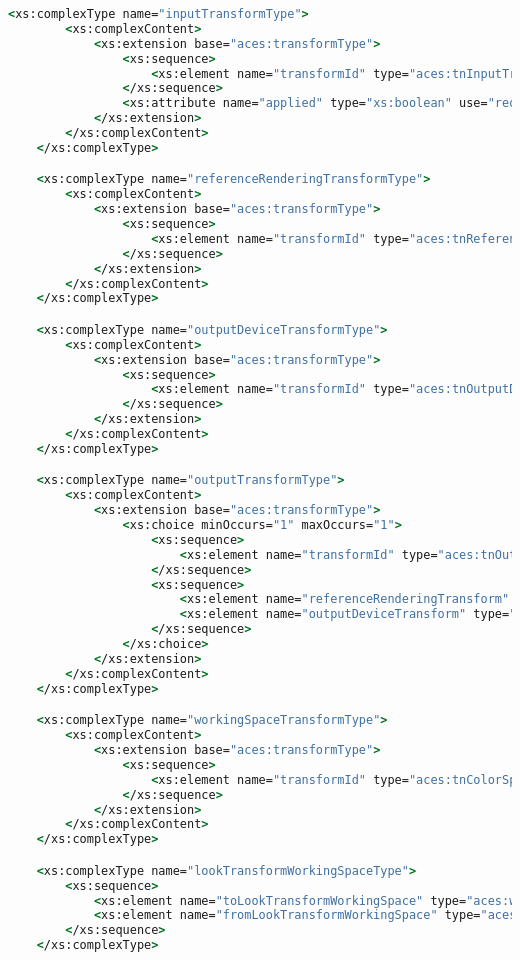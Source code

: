 \begin{lstlisting}[language=csh]
	<xs:complexType name="inputTransformType">
		<xs:complexContent>
			<xs:extension base="aces:transformType">
				<xs:sequence>
					<xs:element name="transformId" type="aces:tnInputTransform" minOccurs="1" maxOccurs="1"/>
				</xs:sequence>
				<xs:attribute name="applied" type="xs:boolean" use="required"/>
			</xs:extension>
		</xs:complexContent>
	</xs:complexType>

	<xs:complexType name="referenceRenderingTransformType">
		<xs:complexContent>
			<xs:extension base="aces:transformType">
				<xs:sequence>
					<xs:element name="transformId" type="aces:tnReferenceRenderingTransform" minOccurs="1" maxOccurs="1"/>
				</xs:sequence>
			</xs:extension>
		</xs:complexContent>
	</xs:complexType>

	<xs:complexType name="outputDeviceTransformType">
		<xs:complexContent>
			<xs:extension base="aces:transformType">
				<xs:sequence>
					<xs:element name="transformId" type="aces:tnOutputDeviceTransform" minOccurs="1" maxOccurs="1"/>
				</xs:sequence>
			</xs:extension>
		</xs:complexContent>
	</xs:complexType>

	<xs:complexType name="outputTransformType">
		<xs:complexContent>
			<xs:extension base="aces:transformType">
				<xs:choice minOccurs="1" maxOccurs="1">
					<xs:sequence>
						<xs:element name="transformId" type="aces:tnOutputTransform" minOccurs="1" maxOccurs="1"/>
					</xs:sequence>
					<xs:sequence>
						<xs:element name="referenceRenderingTransform" type="aces:referenceRenderingTransformType" minOccurs="1" maxOccurs="1"/>
						<xs:element name="outputDeviceTransform" type="aces:outputDeviceTransformType" minOccurs="1" maxOccurs="1"/>
					</xs:sequence>
				</xs:choice>
			</xs:extension>
		</xs:complexContent>
	</xs:complexType>

	<xs:complexType name="workingSpaceTransformType">
		<xs:complexContent>
			<xs:extension base="aces:transformType">
				<xs:sequence>
					<xs:element name="transformId" type="aces:tnColorSpaceConversionTransform" minOccurs="1" maxOccurs="1"/>
				</xs:sequence>
			</xs:extension>
		</xs:complexContent>
	</xs:complexType>

	<xs:complexType name="lookTransformWorkingSpaceType">
		<xs:sequence>
			<xs:element name="toLookTransformWorkingSpace" type="aces:workingSpaceTransformType" minOccurs="0" maxOccurs="1"/>
			<xs:element name="fromLookTransformWorkingSpace" type="aces:workingSpaceTransformType" minOccurs="1" maxOccurs="1"/>
		</xs:sequence>
	</xs:complexType>


\end{lstlisting}
